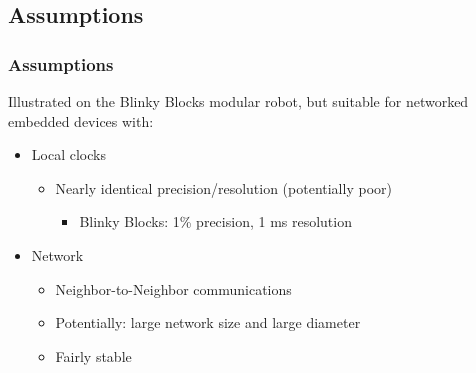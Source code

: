 {\begin{frame}
\begin{center}
\begin{columns}[c]
\begin{column}{.33\textwidth}
	\end{column} 
\end{columns}
\end{center}
\vspace{-0.35cm}
\end{frame}
}

\subsection{Assumptions}

\begin{frame}\frametitle{Assumptions}

Illustrated on the Blinky Blocks modular robot, but suitable for networked embedded devices with:

	\begin{itemize}
    	\item Local clocks
    		\begin{itemize}
    			\item Nearly identical precision/resolution (potentially poor)
    				\begin{itemize}
    					\item Blinky Blocks: 1\% precision, 1 ms resolution
    				\end{itemize}
    		\end{itemize}
    	\item Network
    	    \begin{itemize}
    	    	\item Neighbor-to-Neighbor communications
    	    	\item Potentially: large network size and large diameter
    	    	\item Fairly stable
    	    \end{itemize}
    \end{itemize}


\end{frame}
